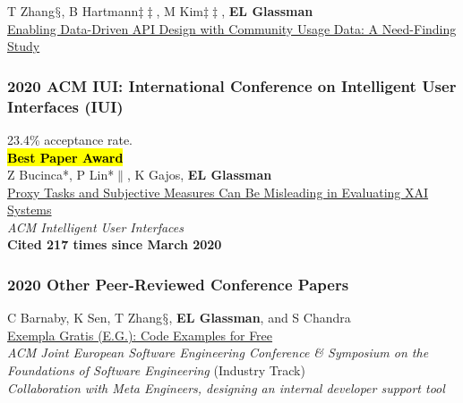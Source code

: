 \documentclass[10pt, a4paper]{article}
\newcommand{\years}[1]{\marginnote{\normalsize #1}}
\begin{document}
\years{\textbf{C16}}T Zhang$\mathsection$, B Hartmann$\ddagger\ddagger$, M Kim$\ddagger\ddagger$, \textbf{EL Glassman}\\
\href{http://glassmanlab.seas.harvard.edu/papers/Data-driven-API-CHI20.pdf}{Enabling Data-Driven API Design with Community Usage Data: A Need-Finding Study}

\subsubsection*{2020 ACM \textbf{IUI}: International Conference on Intelligent User Interfaces (IUI)}
23.4\% acceptance rate.\\



\years{\textbf{C15}}\hl{\textbf{Best Paper Award}}\\
Z Bucinca*, P Lin*$\|$, K Gajos, \textbf{EL Glassman}\\
\href{http://glassmanlab.seas.harvard.edu/papers/bucinca_iui20_proxy.pdf}{Proxy Tasks and Subjective Measures Can Be Misleading in Evaluating XAI Systems}\\
\emph{ACM Intelligent User Interfaces}\\
\textbf{Cited 217 times since March 2020}

\subsubsection*{2020 Other Peer-Reviewed Conference Papers}

\years{2020 FSE\\ \textbf{C14}}C Barnaby, K Sen, T Zhang$\mathsection$, \textbf{EL Glassman}, and S Chandra\\
\href{http://glassmanlab.seas.harvard.edu/papers/fse2020-industry-example-generation.pdf}{Exempla Gratis (E.G.): Code Examples for Free}\\
\emph{ACM Joint European Software Engineering Conference \& Symposium on the Foundations of Software Engineering} (Industry Track)\\
\textit{Collaboration with Meta Engineers, designing an internal developer support tool}
\end{document}
